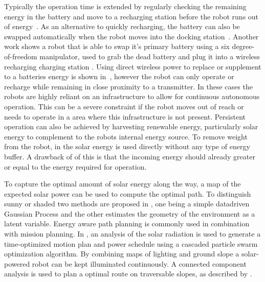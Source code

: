 \documentclass[letterpaper, 10 pt, conference]{ieeeconf}  %
\begin{document}

Typically the operation time is extended by regularly checking the remaining energy in the battery and move to a recharging station before the robot runs out of energy~\cite{pickem_icra_2015, rubenstein_icra_2012}.
As an alternative to quickly recharging, the battery can also be swapped automatically when the robot moves into the docking station~\cite{kemal_mech_2015}.
Another work shows a robot that is able to swap it's primary battery using a six degree-of-freedom manipulator, used to grab the dead battery and plug it into a wireless recharging charging station \cite{zhang_conel_2013}.
Using direct wireless power to replace or supplement to a batteries energy is shown in~\cite{karpelson_icra_2014}, however the robot can only operate or recharge while remaining in close proximity to a transmitter. 
In these cases the robots are highly reliant on an infrastructure to allow for continuous autonomous operation.
This can be a severe constraint if the robot moves out of reach or needs to operate in a area where this infrastructure is not present. Persistent operation can also be achieved by harvesting renewable energy, particularly solar energy to complement to the robots internal energy source. To remove weight from the robot, in \cite{bruhwiler_iros_2015} the solar energy is used directly without any type of energy buffer. A drawback of of this is that the incoming energy should already greater or equal to the energy required for operation. 


To capture the optimal amount of solar energy along the way, a map of the expected solar power can be used to compute the optimal path. To distinguish sunny or shaded two methods are proposed in \cite{plonski_tranro_2016}, one being a simple datadriven Gaussian Process and the other estimates the geometry of the environment as a latent variable.
Energy aware path planning is commonly used in combination with mission planning.
In \cite{kaplan_iros_2016}, an analysis of the solar radiation is used to generate a time-optimized motion plan and power schedule using a cascaded particle swarm optimization algorithm.
By combining maps of lighting and ground slope a solar-powered robot can be kept illuminated continuously. A connected component analysis is used to plan a optimal route on traversable slopes, as described by \cite{otten_icra_2015}.
\end{document}
